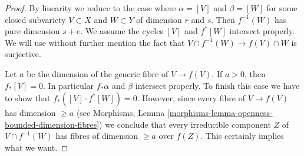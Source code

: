 \documentclass{stacks-project}
\theoremstyle{plain}
\theoremstyle{definition}
\theoremstyle{remark}
\numberwithin{equation}{subsection}
\begin{document}
\begin{proof}
By linearity we reduce to the case where $\alpha = [V]$ and
$\beta = [W]$ for some closed subvariety $V \subset X$ and
$W \subset Y$ of dimension $r$ and $s$. Then $f^{-1}(W)$ has
pure dimension $s + e$. We assume the cycles
$[V]$ and $f^*[W]$ intersect properly. We will use without
further mention the fact that $V \cap f^{-1}(W) \to f(V) \cap W$
is surjective.

\medskip\noindent
Let $a$ be the dimension of the generic fibre of $V \to f(V)$.
If $a > 0$, then $f_*[V] = 0$. In particular $f_*\alpha$ and $\beta$
intersect properly. To finish this case we have to show that
$f_*([V] \cdot f^*[W]) = 0$. However, since every fibre of
$V \to f(V)$ has dimension $\geq a$ (see
Morphisms, Lemma \ref{morphisms-lemma-openness-bounded-dimension-fibres})
we conclude that every irreducible component $Z$ of $V \cap f^{-1}(W)$
has fibres of dimension $\geq a$ over $f(Z)$. This certainly
implies what we want.


\end{proof}
\end{document}
